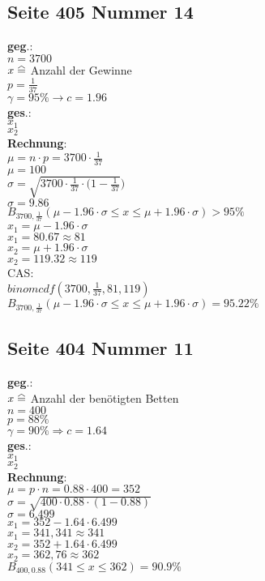 \documentclass[a4paper,12pt]{article}
\newcommand\equalhat{\mathrel{\stackon[1.5pt]{=}{\stretchto{%
    \scalerel*[\widthof{=}]{\wedge}{\rule{1ex}{3ex}}}{0.5ex}}}}
\begin{document}
\subsection*{Seite 405 Nummer 14}
\textbf{geg}.:\\
$n = 3700$\\
$x \equalhat$ Anzahl der Gewinne\\
$p = \frac{1}{37}$\\
$\gamma = 95\% \rightarrow c = 1.96$\\
\textbf{ges}.:\\
$x_{1}$\\
$x_{2}$\\
\textbf{Rechnung}:\\
$\mu = n \cdot p = 3700 \cdot \frac{1}{37}$\\
$\mu = 100$\\
$\sigma = \sqrt{3700 \cdot \frac{1}{37} \cdot (1 - \frac{1}{37}})$\\
$\sigma = 9.86$\\
$B_{3700, \frac{1}{37}}(\mu - 1.96 \cdot \sigma \leq x \leq \mu + 1.96 \cdot \sigma) > 95 \%$\\
$x_{1} = \mu - 1.96 \cdot \sigma$\\
$x_{1} = 80.67 \approx 81$\\
$x_{2} = \mu + 1.96 \cdot \sigma$\\
$x_{2} = 119.32 \approx 119$\\
CAS:\\
$binomcdf(3700, \frac{1}{37}, 81, 119)$\\
$B_{3700, \frac{1}{37}}(\mu - 1.96 \cdot \sigma \leq x \leq \mu + 1.96 \cdot \sigma) = 95.22 \%$\\
\pagebreak
\subsection*{Seite 404 Nummer 11}
\textbf{geg}.:\\
$x \equalhat$ Anzahl der benötigten Betten\\
$n = 400$\\
$p = 88\%$\\
$\gamma = 90\% \Rightarrow c = 1.64$\\
\textbf{ges}.:\\
$x_{1}$\\
$x_{2}$\\
\textbf{Rechnung}:\\
$\mu = p \cdot n = 0.88 \cdot 400 = 352$\\
$\sigma = \sqrt{400 \cdot 0.88 \cdot (1 - 0.88)}$\\
$\sigma = 6.499$\\
$x_{1} = 352 - 1.64 \cdot 6.499$\\
$x_{1} = 341,341 \approx 341$\\
$x_{2} = 352 + 1.64 \cdot 6.499$\\
$x_{2} = 362,76 \approx 362$\\
$B_{400, 0.88}(341 \leq x \leq 362) = 90.9\%$\\
\pagebreak
\end{document}
